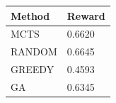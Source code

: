 \begin{tabular}{ll}
\hline
Method & Reward \\
\hline
  MCTS & 0.6620 \\
  RANDOM & 0.6645 \\
  GREEDY & 0.4593 \\
  GA & 0.6345 \\
\hline
\end{tabular}
